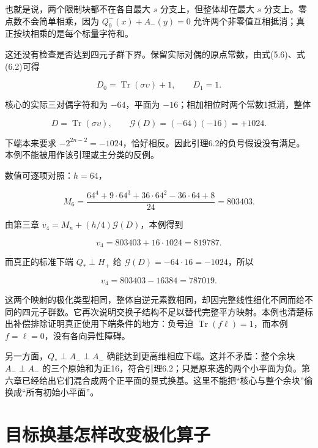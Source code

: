 \documentclass[UTF8,fontset=fandol,zihao=-4,openany,oneside]{ctexbook}
\begin{document}
也就是说，两个限制块都不在各自最大 \(s\) 分支上，但整体却在最大 \(s\) 分支上。零点数不会简单相乘，因为 \(Q_0^-(x)+A_-(y)=0\) 允许两个非零值互相抵消；真正按块相乘的是每个标量字符和。



这还没有检查是否达到四元子群下界。保留实际对偶的原点常数，由式(5.6)、式(6.2)可得



\[
D_0=\operatorname{Tr}(\sigma\upsilon)+1,
\qquad D_1=1.
\]



核心的实际三对偶字符和为 \(-64\)，平面为 \(-16\)；相加相位时两个常数1抵消，整体



\[
D=\operatorname{Tr}(\sigma\upsilon),
\qquad\mathcal G(D)=(-64)(-16)=+1024.
\]



下端本来要求 \(-2^{2n-2}=-1024\)，恰好相反。因此引理6.2的负号假设没有满足。本例不能被用作该引理或主分类的反例。



数值可逐项对照：\(h=64\)，



\[
M_6=\frac{64^4+9\cdot64^3+36\cdot64^2-36\cdot64+8}{24}
=803403.
\]



由第三章 \(v_4=M_n+(h/4)\mathcal G(D)\)，本例得到



\[
v_4=803403+16\cdot1024=819787.
\]



而真正的标准下端 \(Q_*\perp H_+\) 给 \(\mathcal G(D)=-64\cdot16=-1024\)，所以



\[
v_4=803403-16384=787019.
\]



这两个映射的极化类型相同，整体自逆元素数相同，却因完整线性细化不同而给不同的四元子群数。它再次说明交换子结构不足以替代完整平方映射。本例也清楚标出补偿排除证明真正使用下端条件的地方：负号迫 \(\operatorname{Tr}(f\ell)=1\)，而本例 \(f=\ell=0\)，没有各向异性障碍。



另一方面，\(Q_*\perp A_-\perp A_-\) 确能达到更高维相应下端。这并不矛盾：整个余块 \(A_-\perp A_-\) 的三个原始和为正16，符合引理6.2；只是原来选的两个小平面为负。第六章已经给出它们混合成两个正平面的显式换基。这里不能把“核心与整个余块”偷换成“所有初始小平面”。



\section{目标换基怎样改变极化算子}
\end{document}
